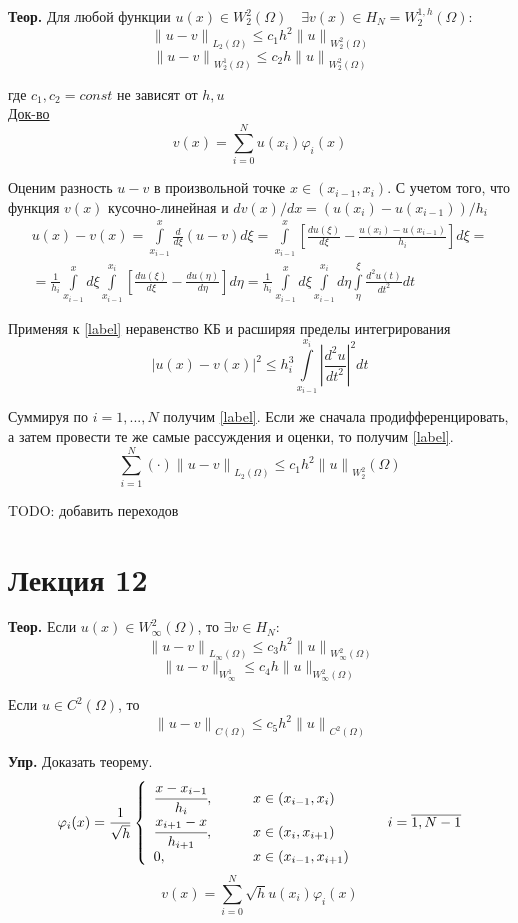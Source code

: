 \documentclass[12pt, a4paper]{article}
\newcommand{\Int}{\int\limits}
\newcommand{\Sum}{\sum\limits}
\begin{document}
\textbf{Теор.} Для любой функции $u(x) \in W_2^2 (\Omega) \quad \exists v(x) \in H_N = W_2^{1, h} (\Omega)$:
\[ {\| u - v \|}_{L_2(\Omega)} \leq c_1 h^2 {\|u\|}_{W_2^2 (\Omega)}  \]
\[ {\| u - v \|}_{W_2^1 (\Omega)}  \leq c_2 h {\|u\|}_{W_2^2 (\Omega)}  \]

где $c_1, c_2 = const$ не зависят от $h, u$ \\

\underline{Док-во}
\[ v(x) = \Sum_{i=0}^{N} u(x_i) \varphi_i (x) \]

Оценим разность $u - v$ в произвольной точке $x \in (x_{i-1}, x_i)$. С учетом того, что функция $v(x)$ кусочно-линейная и $dv(x)/dx = (u(x_i) - u(x_{i-1}))/h_i$
\begin{multline*}
	u(x) - v(x) = \Int_{x_{i-1}}^{x} \frac{d}{d\xi}(u-v) d\xi = \Int_{x_{i-1}}^{x} \left[ \frac{du(\xi)}{d\xi} - \frac{u(x_i) - u(x_{i-1})}{h_i} \right] d\xi = \\
	= \frac{1}{h_i} \Int_{x_{i-1}}^{x} d\xi \Int_{x_{i-1}}^{x_i} \left[ \frac{du (\xi)}{d\xi} - \frac{du(\eta)}{d \eta} \right] d\eta = \frac{1}{h_i} \Int_{x_{i-1}}^{x} d\xi \Int_{x_{i-1}}^{x_i} d \eta \Int_{\eta}^{\xi} \frac{d^2u(t)}{{dt}^2} dt
\end{multline*}

Применяя к \eqref{label} неравенство КБ и расширяя пределы интегрирования
\[ {|u(x) - v(x)|}^2 \leq h_i^3 \Int_{x_{i-1}}^{x_i} {\left|\frac{d^2u}{{dt}^2} \right|}^2 dt \]

Суммируя по $i = 1,...,N$ получим \eqref{label}. Если же сначала продифференцировать, а затем провести те же самые рассуждения и оценки, то получим \eqref{label}.
\[ \Sum_{i=1}^{N} (\cdot) {\|u-v\|}_{L_2 (\Omega)} \leq c_1 h^2 {\|u\|}_{W^2_2} (\Omega)\]

TODO: добавить переходов

\newpage

\section{Лекция 12}

\textbf{Теор.} Если $u(x) \in W^2_{\infty} (\Omega)$, то $ \exists v \in H_N$:
\[ {\|u-v\|}_{L_{\infty}(\Omega)} \leq c_3 h^2 {\|u\|}_{W^2_{\infty}(\Omega)}\]
\[ \| u-v \|_{W_{\infty}^1} \leq c_4 h \|u\|_{W^2_{\infty}(\Omega)}\]

Если $u \in C^2(\Omega)$, то
\[ {\|u-v\|}_{C(\Omega)} \leq c_5 h^2 {\|u\|}_{C^2(\Omega)} \]

\textbf{Упр.} Доказать теорему.
\[ \varphi_i(x) = \frac{1}{\sqrt{h}}
\left\{
\begin{array}{ll}
    \cfrac{x-x_{i-1}}{h_i}, \qquad & x \in (x_{i-1}, x_i) \\
    \cfrac{x_{i+1} - x}{h_{i+1}}, \qquad & x \in (x_i, x_{i+1}) \\
    0, \qquad & x \in (x_{i-1}, x_{i+1})
\end{array}
\right. \qquad i = \overline{1, N-1}
\]
\[ v(x) = \Sum_{i=0}^{N} \sqrt{h} u(x_i) \varphi_i(x) \]
\end{document}
